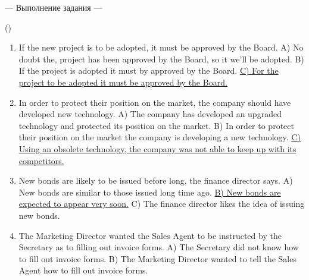 \documentclass[main.tex]{subfiles}
\begin{document}


\newpage
{}

\hypertarget{ltask:2024-04-03-1}{--- Выполнение задания ---} (\hyperref[task:2024-04-03-1]{\color{blue}{перейти к тексту задания}})
\\

\vspace{5pt}
\begin{enumerate}[nosep, leftmargin=*]
	\itemsep15pt
	\item If the new project is to be adopted, it must be approved by the Board.\newline
		A) No doubt the, project has been approved by the Board, so it we'll be adopted.\newline
		B) If the project is adopted it must by approved by the Board.\newline
		\uline{C) For the project to be adopted it must be approved by the Board.}
	\item In order to protect their position on the market, the company should have developed new technology.\newline
		A) The company has developed an upgraded technology and protected its position on the market.\newline
		B) In order to protect their position on the market the company is developing a new technology.\newline
		\uline{C) Using an obsolete technology, the company was not able to keep up with its competitors.}
	\item New bonds are likely to be issued before long, the finance director says.\newline
		A) New bonds are similar to those issued long time ago.\newline
		\uline{B) New bonds are expected to appear very soon.}\newline
		C) The finance director likes the idea of issuing new bonds.
	\item The Marketing Director wanted the Sales Agent to be instructed by the Secretary as to filling out invoice forms.\newline
		A) The Secretary did not know how to fill out invoice forms.\newline
		B) The Marketing Director wanted to tell the Sales Agent how to fill out invoice forms.\newline

\end{enumerate}
\end{document}
